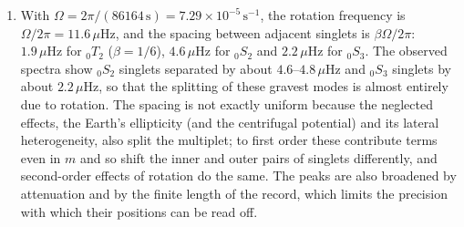 \documentclass[a4paper,10pt]{paper}
\begin{document}
\begin{enumerate}
\begin{enumerate}
\begin{equation*}
    \hat{\mathbf{z}}\times\mathbf{C}_{lm}=\partial_{\theta}Y(\cos\theta\,\hat{\bm{\theta}}+\sin\theta\,\hat{\mathbf{r}})+\frac{\ii m\cos\theta}{\sin\theta}Y\,\hat{\bm{\varphi}},
\end{equation*}
and therefore
\begin{equation*}
    \mathbf{C}_{lm}^{*}\cdot(\hat{\mathbf{z}}\times\mathbf{C}_{lm})=-\frac{\ii m\cos\theta}{\sin\theta}\left(Y\,\partial_{\theta}Y^{*}+Y^{*}\partial_{\theta}Y\right)
    =-\frac{\ii m\cos\theta}{\sin\theta}\,\partial_{\theta}|Y|^{2}.
\end{equation*}
Integrating over the unit sphere,
\begin{multline*}
    \int_{\mathbb{S}^{2}}\mathbf{C}_{lm}^{*}\cdot(\hat{\mathbf{z}}\times\mathbf{C}_{lm})\dd S=-\ii m\int_{0}^{2\pi}\!\!\int_{0}^{\pi}\cos\theta\,\partial_{\theta}|Y|^{2}\dd\theta\dd\varphi \\
    =-\ii m\left\{2\pi\Big[\cos\theta|Y|^{2}\Big]_{0}^{\pi}+\int_{\mathbb{S}^{2}}|Y|^{2}\dd S\right\}=-\ii m,
\end{multline*}
the boundary term vanishing because $Y$ vanishes at the poles for $m\ne0$, and the remaining integral being unity by orthonormality. Hence
\begin{equation*}
    \langle km|W|km\rangle=2\Omega\int_{0}^{b}\rho W^{2}r^{2}\dd r\int_{\mathbb{S}^{2}}\mathbf{C}_{lm}^{*}\cdot(\hat{\mathbf{z}}\times\mathbf{C}_{lm})\dd S
    =-2\ii m\Omega\int_{0}^{b}\rho W^{2}r^{2}\dd r=-\frac{2\ii m\Omega}{l(l+1)},
\end{equation*}
using the stated normalisation, and so $\beta=1/[l(l+1)]$. (The off-diagonal elements $m'\ne m$ vanish because the integrand is then 
proportional to $\ee^{\ii(m-m')\varphi}$, which integrates to zero.) A check on the spheroidal formula quoted in the question is that the 
same manipulations applied to $\mathbf{s}=U\,Y\hat{\mathbf{r}}+V\nabla_{1}Y$ give the angular integral $-\ii m(2UV+V^{2})$.
\item With $\Omega=2\pi/(86164\,\mathrm{s})=7.29\times10^{-5}\,\mathrm{s^{-1}}$, the rotation frequency is $\Omega/2\pi=11.6\,\mu\mathrm{Hz}$, and 
the spacing between adjacent singlets is $\beta\Omega/2\pi$: $1.9\,\mu\mathrm{Hz}$ for ${}_{0}T_{2}$ ($\beta=1/6$), $4.6\,\mu\mathrm{Hz}$ for ${}_{0}S_{2}$ 
and $2.2\,\mu\mathrm{Hz}$ for ${}_{0}S_{3}$. The observed spectra show ${}_{0}S_{2}$ singlets separated by about $4.6$--$4.8\,\mu\mathrm{Hz}$ 
and ${}_{0}S_{3}$ singlets by about $2.2\,\mu\mathrm{Hz}$, so that the splitting of these gravest modes is almost entirely due to rotation. 
The spacing is not exactly uniform because the neglected effects, the Earth's ellipticity (and the centrifugal potential) and its 
lateral heterogeneity, also split the multiplet; to first order these contribute terms even in $m$ and so shift the inner and outer 
pairs of singlets differently, and second-order effects of rotation do the same. The peaks are also broadened by attenuation 
and by the finite length of the record, which limits the precision with which their positions can be read off.
\end{enumerate}

\end{enumerate}
\end{document}
